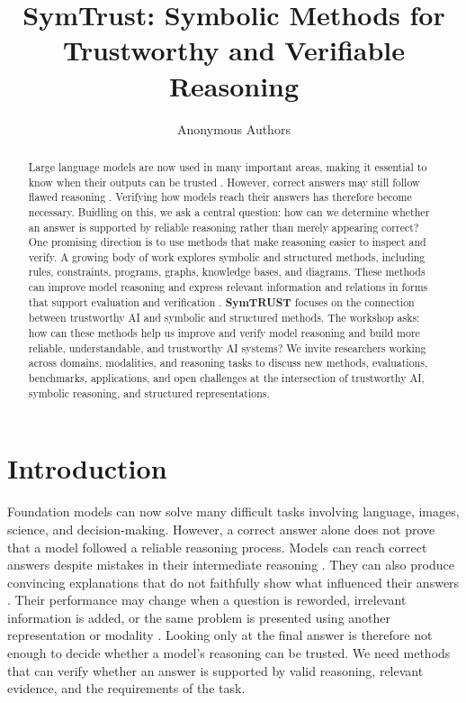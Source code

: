\documentclass[11pt]{article}
\title{SymTrust: Symbolic Methods for Trustworthy and Verifiable Reasoning}
\author{Anonymous Authors}
\begin{document}
\maketitle
\begin{abstract}
Large language models are now used in many important areas, making it essential to know when their outputs can be trusted \citep{chen-etal-2024-critical,zhang-etal-2024-comprehensive-survey,zeng-etal-2023-robotics}. However, correct answers may still follow flawed reasoning \citep{wang-etal-2025-chain}. Verifying how models reach their answers has therefore become necessary. Buidling on this, we ask a central question: how can we determine whether an answer is supported by reliable reasoning rather than merely appearing correct?
One promising direction is to use methods that make reasoning easier to inspect and verify. A growing body of work explores symbolic and structured methods, including rules, constraints, programs, graphs, knowledge bases, and diagrams. These methods can improve model reasoning and express relevant information and relations in forms that support evaluation and verification \citep{pan-etal-2023-logic,olausson-etal-2023-linc,pei-etal-2025-fover}. \textbf{SymTRUST} focuses on the connection between trustworthy AI and symbolic and structured methods. The workshop asks: how can these methods help us improve and verify model reasoning and build more reliable, understandable, and trustworthy AI systems? We invite researchers working across domains, modalities, and reasoning tasks to discuss new methods, evaluations, benchmarks, applications, and open challenges at the intersection of trustworthy AI, symbolic reasoning, and structured representations.
\end{abstract}

\section{Introduction}
Foundation models can now solve many difficult tasks involving language,
images, science, and decision-making. However, a correct answer alone does
not prove that a model followed a reliable reasoning process. Models can
reach correct answers despite mistakes in their intermediate reasoning
\citep{wang-etal-2025-chain}. They can also produce convincing explanations
that do not faithfully show what influenced their answers
\citep{turpin-etal-2023-language,shailya-etal-2025-lext}. Their performance
may change when a question is reworded, irrelevant information is added,
or the same problem is presented using another representation or modality
\citep{mirzadeh-etal-2024-gsm,dagan-etal-2025-cast,
rajpal-etal-2026-spatial}. Looking only at the final answer is therefore
not enough to decide whether a model's reasoning can be trusted. We need
methods that can verify whether an answer is supported by valid reasoning,
relevant evidence, and the requirements of the task.
\end{document}
